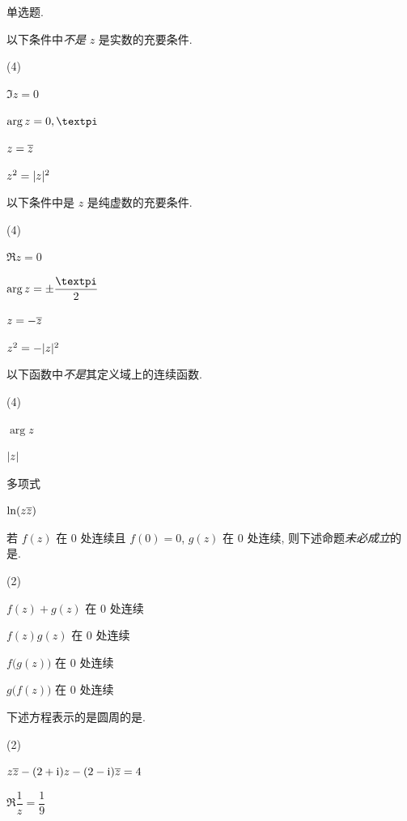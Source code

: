 
\begin{homework}
  \item 单选题.
  \begin{homework}
    \item 以下条件中\fillbrace{}\emph{不是} $z$ 是实数的充要条件.
    \begin{exchoice}(4)
      \item $\Im z=0$
      \item $\arg z=0,\cpi$
      \item $z=\overline z$
      \item $z^2=\lvert z\rvert^2$
    \end{exchoice}
    \item 以下条件中\fillbrace{}是 $z$ 是纯虚数的充要条件.
    \begin{exchoice}(4)
      \item $\Re z=0$
      \item $\arg z=\pm\dfrac\cpi2$
      \item $z=-\overline z$
      \item $z^2=-\lvert z\rvert^2$
    \end{exchoice}
    \item 以下函数中\fillbrace{}\emph{不是}其定义域上的连续函数.
    \begin{exchoice}(4)
      \item $\arg z$
      \item $\lvert z\rvert$
      \item 多项式
      \item $\ln(z\overline z)$
    \end{exchoice}
    \item 若 $f(z)$ 在 $0$ 处连续且 $f(0)=0$, $g(z)$ 在 $0$ 处连续, 则下述命题\emph{未必成立}的是\fillbrace{}.
    \begin{exchoice}(2)
      \item $f(z)+g(z)$ 在 $0$ 处连续
      \item $f(z)g(z)$ 在 $0$ 处连续
      \item $f\bigl(g(z)\bigr)$ 在 $0$ 处连续
      \item $g\bigl(f(z)\bigr)$ 在 $0$ 处连续
    \end{exchoice}
    \item 下述方程表示的是圆周的是\fillbrace{}.
    \begin{exchoice}(2)
      \item $z\overline z-(2+\mathrm{i})z-(2-\mathrm{i})\overline z=4$
      \item $\Re\dfrac{1}{z}=\dfrac{1}{9}$

\end{exchoice}
\end{homework}
\end{homework}
